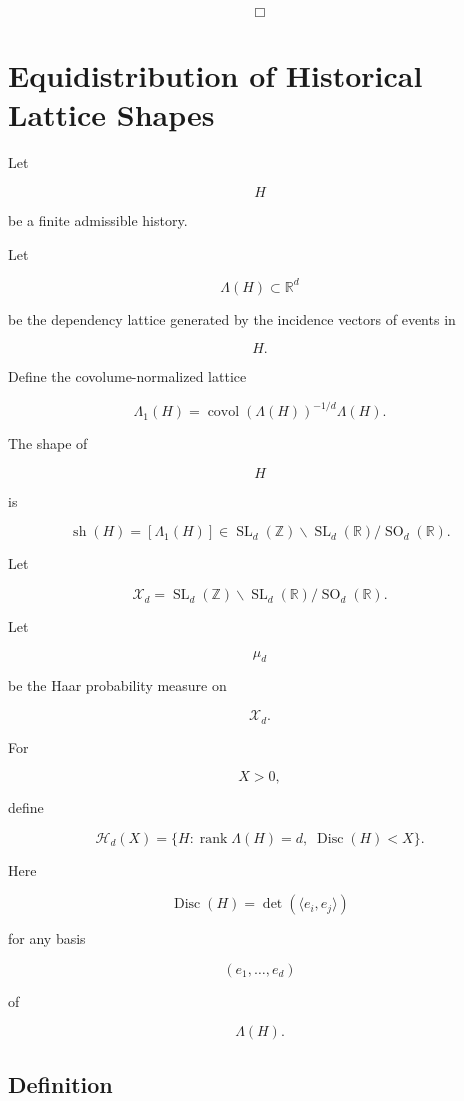 \documentclass[12pt,oneside]{article}
\theoremstyle{definition}
\theoremstyle{remark}
\begin{document}
\[
\Box
\]

\section{Equidistribution of Historical Lattice Shapes}

Let

\[
H
\]

be a finite admissible history.

Let

\[
\Lambda(H)
\subset
\mathbb R^d
\]

be the dependency lattice generated by the incidence vectors of events in

\[
H.
\]

Define the covolume-normalized lattice

\[
\Lambda_1(H)
=
\operatorname{covol}(\Lambda(H))^{-1/d}
\Lambda(H).
\]

The shape of

\[
H
\]

is

\[
\operatorname{sh}(H)
=
[\Lambda_1(H)]
\in
\operatorname{SL}_d(\mathbb Z)
\backslash
\operatorname{SL}_d(\mathbb R)
/\operatorname{SO}_d(\mathbb R).
\]

Let

\[
\mathcal X_d
=
\operatorname{SL}_d(\mathbb Z)
\backslash
\operatorname{SL}_d(\mathbb R)
/\operatorname{SO}_d(\mathbb R).
\]

Let

\[
\mu_d
\]

be the Haar probability measure on

\[
\mathcal X_d.
\]

For

\[
X>0,
\]

define

\[
\mathcal H_d(X)
=
\{
H
:
\operatorname{rank}\Lambda(H)=d,
\;
\operatorname{Disc}(H)<X
\}.
\]

Here

\[
\operatorname{Disc}(H)
=
\det
(
\langle e_i,e_j\rangle
)
\]

for any basis

\[
(e_1,\ldots,e_d)
\]

of

\[
\Lambda(H).
\]

\subsection*{Definition}
\end{document}
